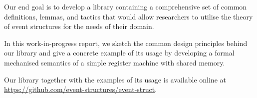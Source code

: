 Our end goal is to develop a \coq library containing 
a comprehensive set of common definitions, lemmas, 
and tactics that would allow researchers 
to utilise the theory of event structures 
for the needs of their domain.

In this work-in-progress report, we sketch 
the common design principles behind our library
and give a concrete example of its usage  
by developing a formal mechanised semantics of a simple 
register machine with shared memory.

Our library together with the examples of 
its usage is available online at \url{https://github.com/event-structures/event-struct}.  
